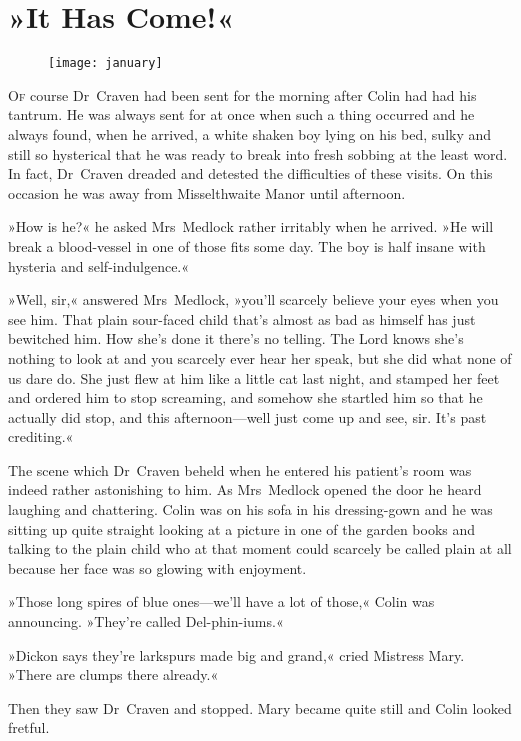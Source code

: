 \chapter{»It Has Come!«} 
	
\begin{figure}[t!]
\centering
\texttt{[image: january]}
\end{figure}

 \lettrine[lines=6]{O}{f} course Dr~Craven had been sent for the morning after Colin had had his tantrum. He was always sent for at once when such a thing occurred and he always found, when he arrived, a white shaken boy lying on his bed, sulky and still so hysterical that he was ready to break into fresh sobbing at the least word. In fact, Dr~Craven dreaded and detested the difficulties of these visits. On this occasion he was away from Misselthwaite Manor until afternoon.

»How is he?« he asked Mrs~Medlock rather irritably when he arrived. »He will break a blood-vessel in one of those fits some day. The boy is half insane with hysteria and self-indulgence.«

»Well, sir,« answered Mrs~Medlock, »you'll scarcely believe your eyes when you see him. That plain sour-faced child that's almost as bad as himself has just bewitched him. How she's done it there's no telling. The Lord knows she's nothing to look at and you scarcely ever hear her speak, but she did what none of us dare do. She just flew at him like a little cat last night, and stamped her feet and ordered him to stop screaming, and somehow she startled him so that he actually did stop, and this afternoon—well just come up and see, sir. It's past crediting.«

The scene which Dr~Craven beheld when he entered his patient's room was indeed rather astonishing to him. As Mrs~Medlock opened the door he heard laughing and chattering. Colin was on his sofa in his dressing-gown and he was sitting up quite straight looking at a picture in one of the garden books and talking to the plain child who at that moment could scarcely be called plain at all because her face was so glowing with enjoyment.

»Those long spires of blue ones—we'll have a lot of those,« Colin was announcing. »They're called Del-phin-iums.«

»Dickon says they're larkspurs made big and grand,« cried Mistress Mary. »There are clumps there already.«

Then they saw Dr~Craven and stopped. Mary became quite still and Colin looked fretful.

